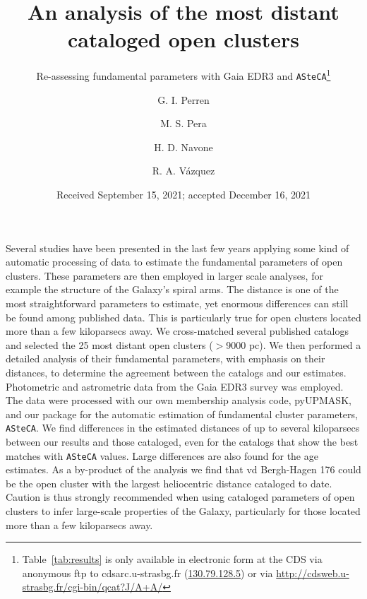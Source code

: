 \documentclass{aa}
\begin{document}
 


\title{An analysis of the most distant cataloged open clusters}
\subtitle{Re-assessing fundamental parameters with Gaia EDR3 and
\texttt{ASteCA}\thanks{
Table~\ref{tab:results} is only available in electronic form
at the CDS via anonymous ftp to cdsarc.u-strasbg.fr (\url{130.79.128.5})
or via \url{http://cdsweb.u-strasbg.fr/cgi-bin/qcat?J/A+A/}}}

\author{G. I. Perren
      \and
      M. S. Pera
      \and
      H. D. Navone
      \and
      R. A. Vázquez
}

\date{Received September 15, 2021; accepted December 16, 2021}

 
\abstract
{Several studies have been presented in the last few years applying some kind of
automatic processing of data to estimate the fundamental parameters of open
clusters. These parameters are then employed in larger scale analyses, for
example the structure of the Galaxy's spiral arms.
The distance is one of the most straightforward parameters to estimate, yet
enormous differences can still be found among published data. This is
particularly true for open clusters located more than a few kiloparsecs away.}
{
We cross-matched several published catalogs and selected the 25 most
distant open clusters ($>$9000 pc). We then performed a detailed analysis of
their fundamental parameters, with emphasis on their distances, to determine the
agreement between the  catalogs and our estimates.}
{Photometric and astrometric data from the Gaia EDR3 survey was employed. The
data were processed with our own membership analysis code, pyUPMASK, and our
package for the automatic estimation of  fundamental cluster parameters, \texttt{ASteCA}.}
{We find differences in the estimated distances of up to several kiloparsecs
between our results and those cataloged, even for the catalogs that show the
best matches with \texttt{ASteCA} values. Large differences are also found for
the age estimates. As a by-product of the analysis we find that
vd Bergh-Hagen 176 could be the open cluster with the largest heliocentric
distance cataloged to date.}
{Caution is thus strongly recommended when using cataloged parameters of open
clusters to infer large-scale properties of the Galaxy, particularly for those
located more than a few kiloparsecs away.}
\end{document}
